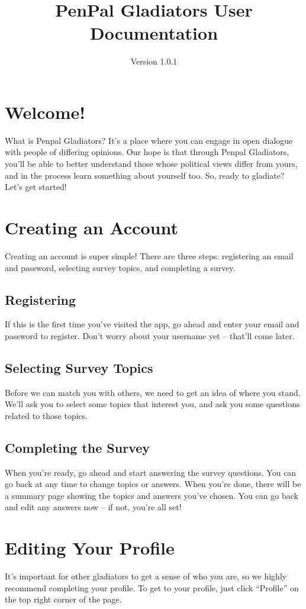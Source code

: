 \documentclass[12pt]{article}
\title{PenPal Gladiators User Documentation}
\author{Version 1.0.1}
\begin{document}
\maketitle
\tableofcontents

\section{Welcome!}
What is Penpal Gladiators? It's a place where you can engage in open dialogue
with people of differing opinions. Our hope is that through Penpal Gladiators,
you'll be able to better understand those whose political views differ from
yours, and in the process learn something about yourself too. So, ready to
gladiate? Let's get started!

\section{Creating an Account}
Creating an account is super simple! There are three steps: registering an email
and password, selecting survey topics, and completing a survey.

\subsection{Registering}
If this is the first time you've visited the app, go ahead and enter your email
and password to register.  Don't worry about your username yet -- that'll come
later.

\subsection{Selecting Survey Topics}
Before we can match you with others, we need to get an idea of where you stand.
We'll ask you to select some topics that interest you, and ask you some
questions related to those topics.

\subsection{Completing the Survey}
When you're ready, go ahead and start answering the survey questions. You can go
back at any time to change topics or answers. When you're done, there will be a
summary page showing the topics and answers you've chosen. You can go back and
edit any answers now – if not, you're all set!

\section{Editing Your Profile}
It's important for other gladiators to get a sense of who you are, so we highly
recommend completing your profile. To get to your profile, just click “Profile”
on the top right corner of the page.\\
\end{document}
